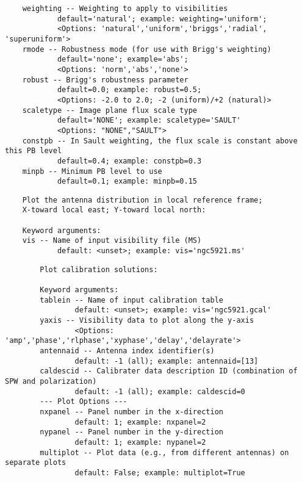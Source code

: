 \begin{verbatim}
    weighting -- Weighting to apply to visibilities
            default='natural'; example: weighting='uniform'; 
            <Options: 'natural','uniform','briggs','radial', 'superuniform'>
    rmode -- Robustness mode (for use with Brigg's weighting)
            default='none'; example='abs'; 
            <Options: 'norm','abs','none'>
    robust -- Brigg's robustness parameter 
            default=0.0; example: robust=0.5; 
            <Options: -2.0 to 2.0; -2 (uniform)/+2 (natural)>
    scaletype -- Image plane flux scale type
            default='NONE'; example: scaletype='SAULT'
            <Options: "NONE","SAULT">
    constpb -- In Sault weighting, the flux scale is constant above this PB level
            default=0.4; example: constpb=0.3
    minpb -- Minimum PB level to use
            default=0.1; example: minpb=0.15
\end{verbatim}
\normalsize


\vspace{3mm}
\small
\begin{verbatim}
    Plot the antenna distribution in local reference frame; 
    X-toward local east; Y-toward local north:
    
    Keyword arguments:
    vis -- Name of input visibility file (MS)
            default: <unset>; example: vis='ngc5921.ms'

\end{verbatim}
\normalsize

\vspace{3mm}
\small
\begin{verbatim}
        Plot calibration solutions: 
        
        Keyword arguments:
        tablein -- Name of input calibration table 
                default: <unset>; example: vis='ngc5921.gcal'
        yaxis -- Visibility data to plot along the y-axis
                <Options: 'amp','phase','rlphase','xyphase','delay','delayrate'>
        antennaid -- Antenna index identifier(s)
                default: -1 (all); example: antennaid=[13]
        caldescid -- Calibrater data description ID (combination of SPW and polarization)
                default: -1 (all); example: caldescid=0
        --- Plot Options ---
        nxpanel -- Panel number in the x-direction
                default: 1; example: nxpanel=2
        nypanel -- Panel number in the y-direction 
                default: 1; example: nypanel=2
        multiplot -- Plot data (e.g., from different antennas) on separate plots
                default: False; example: multiplot=True
\end{verbatim}
\normalsize

